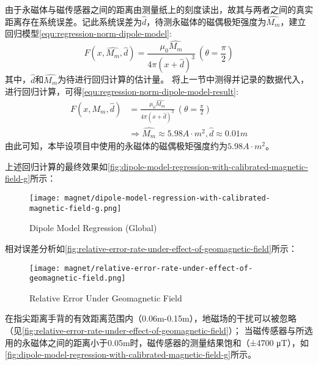 由于永磁体与磁传感器之间的距离由测量纸上的刻度读出，故其与两者之间的真实距离存在系统误差。记此系统误差为$\widehat{d}$，待测永磁体的磁偶极矩强度为$\widehat{M_m}$，建立回归模型\autoref{equ:regression-norm-dipole-model}:
\begin{equation}
    \label{equ:regression-norm-dipole-model}
    F(x, \widehat{M_m}, \widehat{d}) = \frac{\mu_0 \widehat{M_m}}{4\pi(x+\widehat{d})^3} \ (\theta = \frac{\pi}{2})
\end{equation}
其中，$\widehat{d}$和$\widehat{M_m}$为待进行回归计算的估计量。
将上一节中测得并记录的数据代入，进行回归计算，可得\autoref{equ:regression-norm-dipole-model-result}:
\begin{equation}
    \label{equ:regression-norm-dipole-model-result}
    \begin{aligned}
    F(x, \widehat{M_m}, \widehat{d}) &= \frac{\mu_0 \widehat{M_m}}{4\pi(x+\widehat{d})^3} \ (\theta = \frac{\pi}{2}) \\
    & \Longrightarrow \widehat{M_m} \approx 5.98 A\cdot m^2, \widehat{d} \approx 0.01m
    \end{aligned}
\end{equation}
由此可知，本毕设项目中使用的永磁体的磁偶极矩强度约为$5.98 A\cdot m^2$。

上述回归计算的最终效果如\autoref{fig:dipole-model-regression-with-calibrated-magnetic-field-g}所示：

\begin{figure}[H]
    \centering
    \texttt{[image: magnet/dipole-model-regression-with-calibrated-magnetic-field-g.png]}
    \caption{\label{fig:dipole-model-regression-with-calibrated-magnetic-field-g}Dipole Model Regression (Global)}
\end{figure}

相对误差分析如\autoref{fig:relative-error-rate-under-effect-of-geomagnetic-field}所示：

\begin{figure}[H]
    \centering
    \texttt{[image: magnet/relative-error-rate-under-effect-of-geomagnetic-field.png]}
    \caption{\label{fig:relative-error-rate-under-effect-of-geomagnetic-field}Relative Error Under Geomagnetic Field}
\end{figure}

在指尖距离手背的有效距离范围内（0.06m-0.15m），地磁场的干扰可以被忽略（见\autoref{fig:relative-error-rate-under-effect-of-geomagnetic-field}）；
当磁传感器与所选用的永磁体之间的距离小于0.05m时，磁传感器的测量结果饱和（±4700 μT），如\autoref{fig:dipole-model-regression-with-calibrated-magnetic-field-g}所示。

